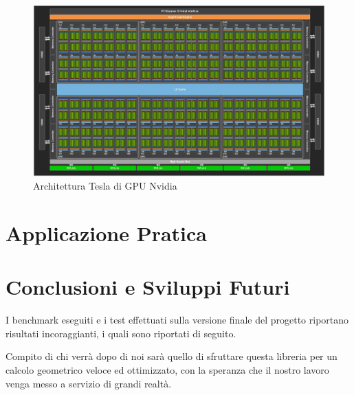 \documentclass[a4paper]{extreport}
\begin{document}
\begin{figure}[!h]
    \includegraphics[width=\textwidth]{immagini/Schermata del 2022-06-23 11-33-59.png}
    \caption{Architettura Tesla di GPU Nvidia}
\end{figure}
\begin{multicols*}{2}
\chapter{Applicazione Pratica}
\chapter{Conclusioni e Sviluppi Futuri}
I benchmark eseguiti e i test effettuati sulla versione finale del progetto riportano risultati incoraggianti, i quali sono riportati di seguito.

Compito di chi verrà dopo di noi sarà quello di sfruttare questa libreria per un calcolo geometrico veloce ed ottimizzato, con la speranza che il nostro lavoro venga messo a servizio di grandi realtà.
\end{multicols*}
\normalsize

\end{document}
